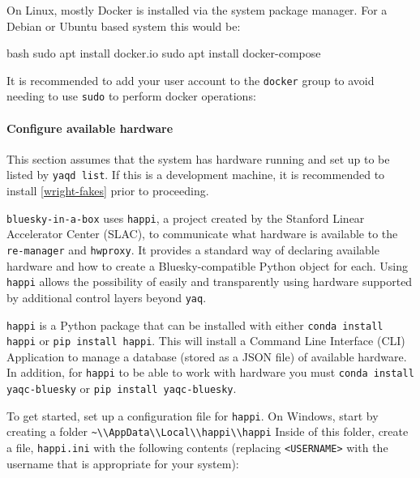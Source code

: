 On Linux, mostly Docker is installed via the system package manager.
For a Debian or Ubuntu based system this would be:

\begin{codefragment}{bash}
sudo apt install docker.io
sudo apt install docker-compose
\end{codefragment}

It is recommended to add your user account to the \texttt{docker} group to avoid needing to use \texttt{sudo} to perform docker operations:


\paragraph{Configure available \yaq{} hardware}

This section assumes that the system has \yaq{} hardware running and set up to be listed by \texttt{yaqd list}.
If this is a development machine, it is recommended to install \ref{wright-fakes} prior to proceeding.

\texttt{bluesky-in-a-box} uses \texttt{happi}\cite{happi}, a project created by the Stanford Linear Accelerator Center (SLAC), to communicate what hardware is available to the \texttt{re-manager} and \texttt{hwproxy}.
It provides a standard way of declaring available hardware and how to create a Bluesky-compatible Python object for each.
Using \texttt{happi} allows the possibility of easily and transparently using hardware supported by additional control layers beyond \texttt{yaq}.

\texttt{happi} is a Python package that can be installed with either \texttt{conda install happi} or \texttt{pip install happi}.
This will install a Command Line Interface (CLI) Application to manage a database (stored as a JSON file) of available hardware.
In addition, for \texttt{happi} to be able to work with \yaq{} hardware you must \texttt{conda install yaqc-bluesky} or \texttt{pip install yaqc-bluesky}.

To get started, set up a configuration file for \texttt{happi}.
On Windows, start by creating a folder \nolinkurl{~\\AppData\\Local\\happi\\happi}
Inside of this folder, create a file, \nolinkurl{happi.ini} with the following contents (replacing \texttt{<USERNAME>} with the username that is appropriate for your system):

